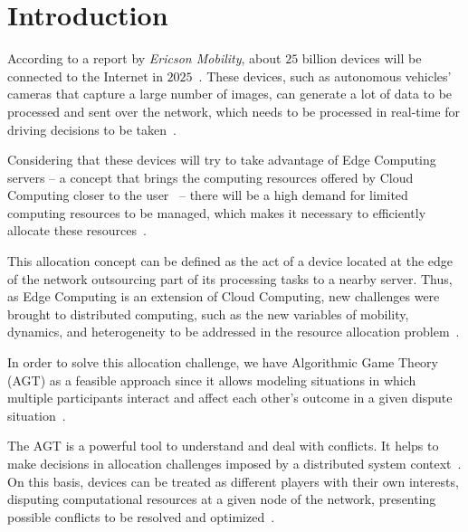 \documentclass[English]{ic-tese-v3}
\begin{document}



\tableofcontents


\fimdaspaginasiniciais

\doublespacing

\chapter{Introduction}
\label{ch:intro}
According to a report by \emph{Ericson Mobility}, about $25$ billion devices will be connected to the Internet in $2025$~\cite{Ericon2020}. These devices, such as autonomous vehicles' cameras that capture a large number of images, can generate a lot of data to be processed and sent over the network, which needs to be processed in real-time for driving decisions to be taken~\cite{DustdarEdge2016}.

Considering that these devices will try to take advantage of Edge Computing servers -- a concept that brings the computing resources offered by Cloud Computing closer to the user~\cite{YuanPrimer2018} -- there will be a high demand for limited computing resources to be managed, which makes it necessary to efficiently allocate these resources~\cite{DongGTMEC2020}. 

This allocation concept can be defined as the act of a device located at the edge of the network outsourcing part of its processing tasks to a nearby server. Thus, as Edge Computing is an extension of Cloud Computing, new challenges were brought to distributed computing, such as the new variables of mobility, dynamics, and heterogeneity to be addressed in the resource allocation problem~\cite{BitAlgorithms2012}.

In order to solve this allocation challenge, we have Algorithmic Game Theory (AGT) as a feasible approach since it allows modeling situations in which multiple participants interact and affect each other's outcome in a given dispute situation~\cite{TimAGT2007}. 

The AGT is a powerful tool to understand and deal with conflicts. It helps to make decisions in allocation challenges imposed by a distributed system context~\cite{MouraGTEdge2018}. On this basis, devices can be treated as different players with their own interests, disputing computational resources at a given node of the network, presenting possible conflicts to be resolved and optimized~\cite{MouraGTEdge2018,DescentLiu2017}.
\end{document}

